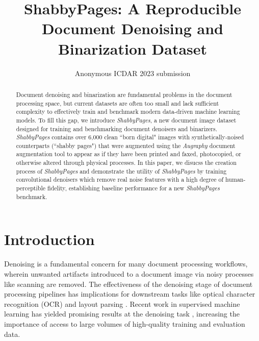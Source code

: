 \documentclass[runningheads]{llncs}
\begin{document}
\title{ShabbyPages: A Reproducible Document Denoising and Binarization Dataset}
%
%

\author{Anonymous ICDAR 2023 submission}


\maketitle

\begin{abstract}
Document denoising and binarization are fundamental problems in the document processing space, but current datasets are often too small and lack sufficient complexity to effectively train and benchmark modern data-driven machine learning models.
To fill this gap, we introduce \emph{ShabbyPages}, a new document image dataset designed for training and benchmarking document denoisers and binarizers.
\emph{ShabbyPages} contains over 6,000 clean ``born digital" images with synthetically-noised counterparts (``shabby pages") that were augmented using the \emph{Augraphy} document augmentation tool to appear as if they have been printed and faxed, photocopied, or otherwise altered through physical processes.
In this paper, we disucss the creation process of \emph{ShabbyPages} and demonstrate the utility of \emph{ShabbyPages} by training convolutional denoisers which remove real noise features with a high degree of human-perceptible fidelity, establishing baseline performance for a new \emph{ShabbyPages} benchmark.
\end{abstract}

\section{Introduction}
Denoising is a fundamental concern for many document processing workflows, wherein unwanted artifacts introduced to a document image via noisy processes like scanning are removed.
The effectiveness of the denoising stage of document processing pipelines has implications for downstream tasks like optical character recognition (OCR) and layout parsing \cite{Mustafa_2018-wan,blind-denoising-iccv-2021,patch-based-document-denoising,character-recognition-systems,ogorman-document-image-analysis,Rotman2022-hh}.
Recent work in supervised machine learning has yielded promising results at the denoising task \cite{tensmeyer-cnn-binarization-2017,blind-denoising-iccv-2021}, increasing the importance of access to large volumes of high-quality training and evaluation data.
\end{document}
